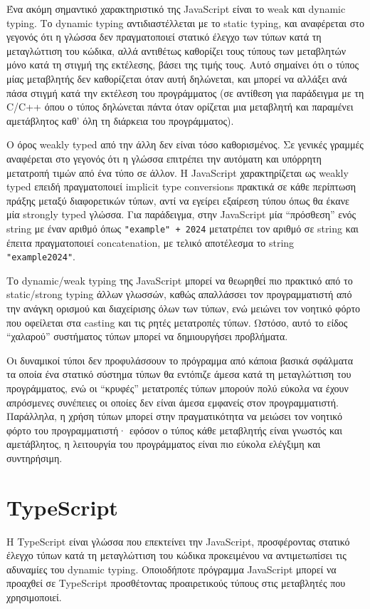 \documentclass[../thesis.tex]{subfiles}
\begin{document}
\bigskip

Ένα ακόμη σημαντικό χαρακτηριστικό της JavaScript είναι το weak και dynamic typing.
Το dynamic typing αντιδιαστέλλεται με το static typing, και αναφέρεται στο γεγονός ότι η γλώσσα δεν πραγματοποιεί στατικό έλεγχο των τύπων κατά τη μεταγλώττιση του κώδικα, αλλά αντιθέτως καθορίζει τους τύπους των μεταβλητών μόνο κατά τη στιγμή της εκτέλεσης, βάσει της τιμής τους.
Αυτό σημαίνει ότι ο τύπος μίας μεταβλητής δεν καθορίζεται όταν αυτή δηλώνεται, και μπορεί να αλλάξει ανά πάσα στιγμή κατά την εκτέλεση του προγράμματος (σε αντίθεση για παράδειγμα με τη C/C++ όπου ο τύπος δηλώνεται πάντα όταν ορίζεται μια μεταβλητή και παραμένει αμετάβλητος καθ' όλη τη διάρκεια του προγράμματος).

Ο όρος weakly typed από την άλλη δεν είναι τόσο καθορισμένος.
Σε γενικές γραμμές αναφέρεται στο γεγονός ότι η γλώσσα επιτρέπει την αυτόματη και υπόρρητη μετατροπή τιμών από ένα τύπο σε άλλον.
Η JavaScript χαρακτηρίζεται ως weakly typed επειδή πραγματοποιεί implicit type conversions πρακτικά σε κάθε περίπτωση πράξης μεταξύ διαφορετικών τύπων, αντί να εγείρει εξαίρεση τύπου όπως θα έκανε μία strongly typed γλώσσα.
Για παράδειγμα, στην JavaScript μία ``πρόσθεση'' ενός string με έναν αριθμό όπως \texttt{"example" + 2024} μετατρέπει τον αριθμό σε string και έπειτα πραγματοποιεί concatenation, με τελικό αποτέλεσμα το string \texttt{"example2024"}.

\bigskip

Το dynamic/weak typing της JavaScript μπορεί να θεωρηθεί πιο πρακτικό από το static/strong typing άλλων γλωσσών, καθώς απαλλάσσει τον προγραμματιστή από την ανάγκη ορισμού και διαχείρισης όλων των τύπων, ενώ μειώνει τον νοητικό φόρτο  που οφείλεται στα casting και τις ρητές μετατροπές τύπων.
Ωστόσο, αυτό το είδος ``χαλαρού'' συστήματος τύπων μπορεί να δημιουργήσει προβλήματα.

Οι δυναμικοί τύποι δεν προφυλάσσουν το πρόγραμμα από κάποια βασικά σφάλματα τα οποία ένα στατικό σύστημα τύπων θα εντόπιζε άμεσα κατά τη μεταγλώττιση του προγράμματος, ενώ οι ``κρυφές'' μετατροπές τύπων μπορούν πολύ εύκολα να έχουν απρόσμενες συνέπειες οι οποίες δεν είναι άμεσα εμφανείς στον προγραμματιστή.
Παράλληλα, η χρήση τύπων μπορεί στην πραγματικότητα να μειώσει τον νοητικό φόρτο του προγραμματιστή· εφόσον ο τύπος κάθε μεταβλητής είναι γνωστός και αμετάβλητος, η λειτουργία του προγράμματος είναι πιο εύκολα ελέγξιμη και συντηρήσιμη.

\section{TypeScript}
Η TypeScript είναι γλώσσα που επεκτείνει την JavaScript, προσφέροντας στατικό έλεγχο τύπων κατά τη μεταγλώττιση του κώδικα προκειμένου να αντιμετωπίσει τις αδυναμίες του dynamic typing.
Οποιοδήποτε πρόγραμμα JavaScript μπορεί να προαχθεί σε TypeScript προσθέτοντας προαιρετικούς τύπους στις μεταβλητές που χρησιμοποιεί.
\end{document}
